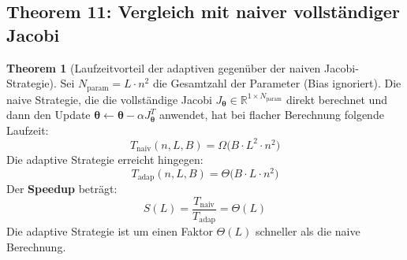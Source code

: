 ﻿\documentclass[a4paper,12pt]{article}
\theoremstyle{definition}
\newtheorem{theorem}{Theorem}
\begin{document}
\subsection{Theorem 11: Vergleich mit naiver vollständiger Jacobi}

\begin{theorem}[Laufzeitvorteil der adaptiven gegenüber der naiven Jacobi-Strategie]
	\label{thm:comparison}
	Sei $N_{\mathrm{param}} = L \cdot n^2$ die Gesamtzahl der Parameter (Bias ignoriert). Die naive Strategie, die die vollständige Jacobi $J_{\boldsymbol{\theta}} \in \mathbb{R}^{1 \times N_{\mathrm{param}}}$ direkt berechnet und dann den Update $\boldsymbol{\theta} \leftarrow \boldsymbol{\theta} - \alpha J_{\boldsymbol{\theta}}^T$ anwendet, hat bei flacher Berechnung folgende Laufzeit:
	\[
	T_{\mathrm{naiv}}(n, L, B) = \Omega\bigl(B \cdot L^2 \cdot n^2\bigr)
	\]
	Die adaptive Strategie erreicht hingegen:
	\[
	T_{\mathrm{adap}}(n, L, B) = \Theta\bigl(B \cdot L \cdot n^2\bigr)
	\]
	Der \textbf{Speedup} beträgt:
	\[
	S(L) = \frac{T_{\mathrm{naiv}}}{T_{\mathrm{adap}}} = \Theta(L)
	\]
	Die adaptive Strategie ist um einen Faktor $\Theta(L)$ schneller als die naive Berechnung.
\end{theorem}
\end{document}
